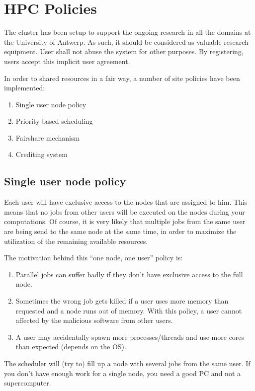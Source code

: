 \chapter{HPC Policies}
\label{ch:hpc-policies}

The cluster has been setup to support the ongoing research in all the domains
at the University of Antwerp.  As such, it should be considered as valuable
research equipment.  User shall not abuse the system for other purposes. By
registering, users accept this implicit user agreement.

In order to shared resources in a fair way, a number of site policies have been
implemented:

\begin{enumerate}
\item  Single user node policy
\item  Priority based scheduling
\item  Fairshare mechanism
\item  Crediting system
\end{enumerate}

\section{Single user node policy}

Each user will have exclusive access to the nodes that are assigned to him.
This means that no jobs from other users will be executed on the nodes during
your computations.  Of course, it is very likely that multiple jobs from the
same user are being send to the same node at the same time, in order to
maximize the utilization of the remaining available resources.

The motivation behind this ``one node, one user'' policy is:

\begin{enumerate}
\item  Parallel jobs can suffer badly if they don't have exclusive access to the full node.
\item  Sometimes the wrong job gets killed if a user uses more memory than requested and a node runs out of memory.  With this policy, a user cannot affected by the malicious software from other users.
\item  A user may accidentally spawn more processes/threads and use more cores than expected (depends on the OS).
\end{enumerate}

The scheduler will (try to) fill up a node with several jobs from the same
user. If you don't have enough work for a single node, you need a good PC and
not a supercomputer.

